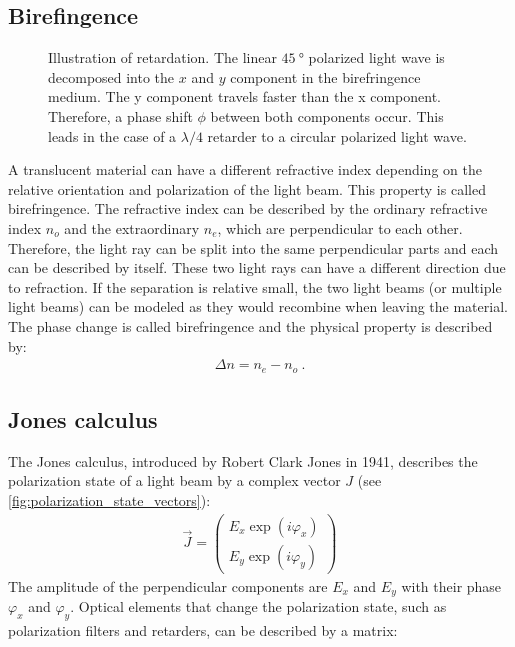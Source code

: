 \subsection{Birefingence}
%
\begin{figure}[!t]
\centering
\setlength{\tikzwidth}{\textwidth}
\caption{Illustration of retardation. The linear $\SI{45}{\degree}$ polarized light wave is decomposed into the $x$ and $y$ component in the birefringence medium. The y component travels faster than the x component. Therefore, a phase shift $\phi$ between both components occur. This leads in the case of a $\lambda/4$ retarder to a circular polarized light wave.}
\label{fig:optic_retardation}
\end{figure}
%
A translucent material can have a different refractive index depending on the relative orientation and polarization of the light beam.
This property is called birefringence.
The refractive index can be described by the ordinary refractive index $n_o$ and the extraordinary $n_e$, which are perpendicular to each other.
Therefore, the light ray can be split into the same perpendicular parts and each can be described by itself.
These two light rays can have a different direction due to refraction.
If the separation is relative small, the two light beams (or multiple light beams) can be modeled as they would recombine when leaving the material.
The phase change is called birefringence and the physical property is described by:
%
\begin{align}
    \Delta n = n_e - n_o \> .
\end{align}
%
%
%
\subsection{Jones calculus}
\label{sec:jones}
% 
The Jones calculus, introduced by Robert Clark Jones in 1941, describes the polarization state of a light beam by a complex vector $J$ (see \cref{fig:polarization_state_vectors}):
%
\begin{align}
    \vec{J} = \begin{pmatrix} E_x \exp(i \varphi_x) \\ E_y \exp(i \varphi_y) \end{pmatrix}
\end{align}
%
The amplitude of the perpendicular components are $E_x$ and $E_y$ with their phase $\varphi_x$ and $\varphi_y$.
Optical elements that change the polarization state, such as polarization filters and retarders, can be described by a matrix:
%
